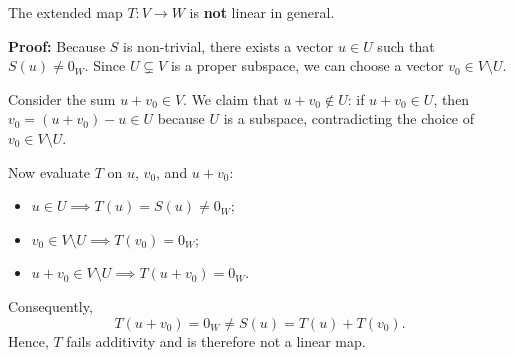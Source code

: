 \begin{exercisesolution}
\label{sol:extending_linear_map_by_zero}
The extended map $T \colon V \to W$ is \textbf{not} linear in general.

\textbf{Proof:}
Because $S$ is non-trivial, there exists a vector $u \in U$ such that $S(u) \ne 0_W$. Since $U \subsetneq V$ is a proper subspace, we can choose a vector $v_0 \in V \setminus U$.

Consider the sum $u + v_0 \in V$. We claim that $u + v_0 \notin U$: if $u + v_0 \in U$, then $v_0 = (u + v_0) - u \in U$ because $U$ is a subspace, contradicting the choice of $v_0 \in V \setminus U$.

Now evaluate $T$ on $u$, $v_0$, and $u + v_0$:
\begin{itemize}
    \item $u \in U \implies T(u) = S(u) \ne 0_W$;
    \item $v_0 \in V \setminus U \implies T(v_0) = 0_W$;
    \item $u + v_0 \in V \setminus U \implies T(u + v_0) = 0_W$.
\end{itemize}
Consequently,
\[
T(u + v_0) = 0_W \ne S(u) = T(u) + T(v_0).
\]
Hence, $T$ fails additivity and is therefore not a linear map.
\end{exercisesolution}

